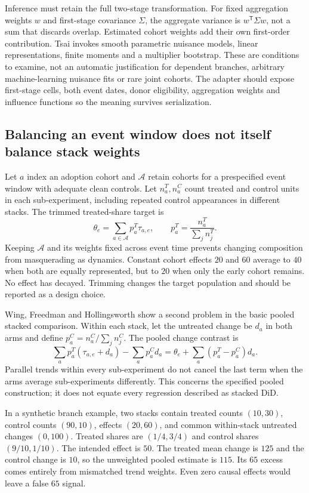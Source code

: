 Inference must retain the full two-stage transformation. For fixed aggregation weights $w$ and first-stage covariance
$\Sigma$, the aggregate variance is $w^{\mathsf T}\Sigma w$, not a sum that discards overlap. Estimated cohort weights
add their own first-order contribution. Tsai invokes smooth parametric nuisance models, linear representations, finite
moments and a multiplier bootstrap. These are conditions to examine, not an automatic justification for dependent branches,
arbitrary machine-learning nuisance fits or rare joint cohorts. The adapter should expose first-stage cells, both event
dates, donor eligibility, aggregation weights and influence functions so the meaning survives serialization.\citep{exec28_panel_tsai}

\subsection{Balancing an event window does not itself balance stack weights}

Let $a$ index an adoption cohort and $\mathcal A$ retain cohorts for a prespecified event window with adequate clean
controls. Let $n_a^T,n_a^C$ count treated and control units in each sub-experiment, including repeated control appearances
in different stacks. The trimmed treated-share target is
\[
 \theta_e=\sum_{a\in\mathcal A}p_a^T\tau_{a,e},\qquad p_a^T=\frac{n_a^T}{\sum_j n_j^T}.
\]
Keeping $\mathcal A$ and its weights fixed across event time prevents changing composition from masquerading as dynamics.
Constant cohort effects $20$ and $60$ average to $40$ when both are equally represented, but to $20$ when only the early
cohort remains. No effect has decayed. Trimming changes the target population and should be reported as a design choice.
\citep{exec28_panel_wing,exec28_panel_reference}

Wing, Freedman and Hollingsworth show a second problem in the basic pooled stacked comparison. Within each stack, let
the untreated change be $d_a$ in both arms and define $p_a^C=n_a^C/\sum_jn_j^C$. The pooled change contrast is
\[
 \sum_a p_a^T(\tau_{a,e}+d_a)-\sum_a p_a^C d_a
 =\theta_e+\sum_a(p_a^T-p_a^C)d_a.
\]
Parallel trends within every sub-experiment do not cancel the last term when the arms average sub-experiments differently.
This concerns the specified pooled construction; it does not equate every regression described as stacked DiD.
\citep{exec28_panel_wing}

In a synthetic branch example, two stacks contain treated counts $(10,30)$, control counts $(90,10)$, effects $(20,60)$,
and common within-stack untreated changes $(0,100)$. Treated shares are $(1/4,3/4)$ and control shares $(9/10,1/10)$.
The intended effect is $50$. The treated mean change is $125$ and the control change is $10$, so the unweighted pooled
estimate is $115$. Its $65$ excess comes entirely from mismatched trend weights. Even zero causal effects would leave
a false $65$ signal.\citep{exec28_panel_reference}

